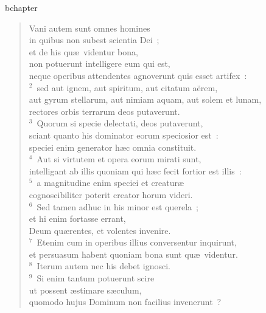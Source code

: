 bchapter\begin{verse}\vspace{-19pt}Vani autem sunt omnes homines\\ in quibus non subest scientia Dei~;\\ et de his qu\ae\ videntur bona,\\ non potuerunt intelligere eum qui est,\\ neque operibus attendentes agnoverunt quis esset artifex~:\\
${}^{2}$~sed aut ignem, aut spiritum, aut citatum a\"erem,\\ aut gyrum stellarum, aut nimiam aquam, aut solem et lunam,\\ rectores orbis terrarum deos putaverunt.\\
${}^{3}$~Quorum si specie delectati, deos putaverunt,\\ sciant quanto his dominator eorum speciosior est~:\\ speciei enim generator h\ae c omnia constituit.\\
${}^{4}$~Aut si virtutem et opera eorum mirati sunt,\\ intelligant ab illis quoniam qui h\ae c fecit fortior est illis~:\\
${}^{5}$~a magnitudine enim speciei et creatur\ae \\ cognoscibiliter poterit creator horum videri.\\
${}^{6}$~Sed tamen adhuc in his minor est querela~;\\ et hi enim fortasse errant,\\ Deum qu\ae rentes, et volentes invenire.\\
${}^{7}$~Etenim cum in operibus illius conversentur inquirunt,\\ et persuasum habent quoniam bona sunt qu\ae\ videntur.\\
${}^{8}$~Iterum autem nec his debet ignosci.\\
${}^{9}$~Si enim tantum potuerunt scire\\ ut possent \ae stimare s\ae culum,\\ quomodo hujus Dominum non facilius invenerunt~?\end{verse}


